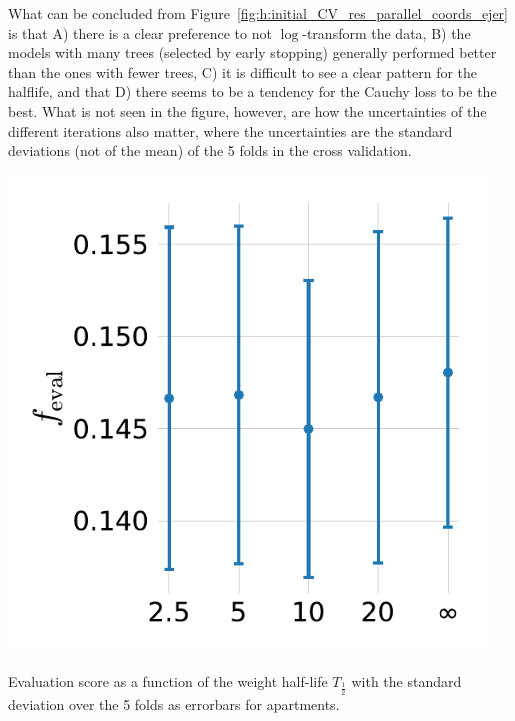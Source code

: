 What can be concluded from Figure~\ref{fig:h:initial_CV_res_parallel_coords_ejer} is that A) there is a clear preference to not $\log$-transform the data, B) the models with many trees (selected by early stopping) generally performed better than the ones with fewer trees, C) it is difficult to see a clear pattern for the halflife, and that D) there seems to be a tendency for the Cauchy loss to be the best. What is not seen in the figure, however, are how the uncertainties of the different iterations also matter, where the uncertainties are the standard deviations (not of the mean) of the \num{5} folds in the cross validation.
\begin{marginfigure}
  \centerfloat
  \includegraphics[width=0.95\textwidth, trim=0 0 0 0, clip]{figures/housing/Ejerlejlighed_v19_cut_all_Ncols_all_MAD_gridsearch_half.pdf}
  \caption[Initial HPO Results for the Weight Half-life $T_{\frac{1}{2}}$]
          {Evaluation score as a function of the weight half-life $T_{\frac{1}{2}}$ with the standard deviation over the \num{5} folds as errorbars for apartments.}
  \label{fig:h:hpo_gridsearch_objective}
\end{marginfigure}

